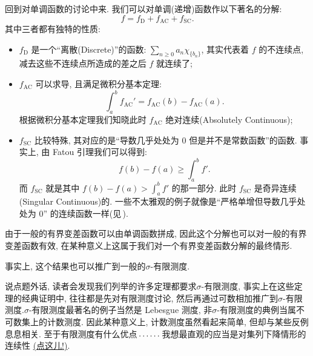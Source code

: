 \begin{alterendnote}
    回到对单调函数的讨论中来. 我们可以对单调(递增)函数作以下著名的分解:
    \[f = f_{\mathrm D} + f_{\mathrm{AC}} + f_{\mathrm{SC}}.\]
    其中三者都有独特的性质:
    \begin{itemize}
        \item $f_{\mathrm D}$ 是一个``离散(Discrete)''的函数: $\sum_{n\geqslant 0}a_n\chi_{\{b_n\}}$, 其实代表着 $f$ 的不连续点, 减去这些不连续点所造成的差之后 $f$ 就连续了;
        \item $f_{\mathrm{AC}}$ 可以求导, 且满足微积分基本定理: \[\int_a^b f_{\mathrm{AC}}' = f_{\mathrm{AC}}(b)-f_{\mathrm{AC}}(a).\] 根据微积分基本定理我们知晓此时 $f_{\mathrm{AC}}$ 绝对连续(Absolutely Continuous);
        \item $f_{\mathrm{SC}}$ 比较特殊, 其对应的是``导数几乎处处为 $0$ 但是并不是常数函数''的函数. 事实上, 由 Fatou 引理我们可以得到: \[f(b) - f(a) \geqslant \int_{a}^b f'.\] 而 $f_{\mathrm{SC}}$ 就是其中 $f(b) - f(a) > \int_{a}^b f'$ 的那一部分. 此时 $f_{\mathrm{SC}}$ 是奇异连续(Singular Continuous)的. 一些不太雅观的例子就像是``严格单增但导数几乎处处为 $0$'' 的连续函数一样(见\,\cite{Brown69}).
    \end{itemize}
    由于一般的有界变差函数可以由单调函数拼成, 因此这个分解也可以对一般的有界变差函数有效, 在某种意义上这属于我们对一个有界变差函数分解的最终情形.
\end{alterendnote}
\begin{alterendnote}
    \label{Fubini}事实上, 这个结果也可以推广到一般的$\sigma $-有限测度. \par 说点题外话, 读者会发现我们列举的许多定理都要求$\sigma $-有限测度, 事实上在这些定理的经典证明中, 往往都是先对有限测度讨论, 然后再通过可数相加推广到$\sigma $-有限测度.$\sigma $-有限测度最著名的例子当然是 Lebesgue 测度, 非$\sigma $-有限测度的典例当属不可数集上的计数测度. 因此某种意义上, 计数测度虽然看起来简单, 但却与某些反例息息相关. 至于有限测度有什么优点\,$\mathinner{\ldotp \ldotp \ldotp\ldotp \ldotp \ldotp}$\,我想最直观的应当是对集列下降情形的连续性 \hyperref[测度的连续性:集列下降]{(点这儿!)}.
\end{alterendnote}
